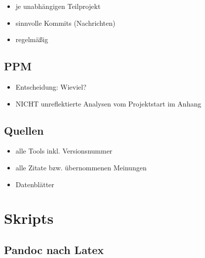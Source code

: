 \begin{itemize}
\tightlist
\item
  je unabhängigen Teilprojekt
\item
  sinnvolle Kommits (Nachrichten)
\item
  regelmäßig
\end{itemize}

\hypertarget{ppm}{%
\subsection{PPM}\label{ppm}}

\begin{itemize}
\tightlist
\item
  Entscheidung: Wieviel?
\item
  NICHT unreflektierte Analysen vom Projektstart im Anhang
\end{itemize}

\hypertarget{quellen}{%
\subsection{Quellen}\label{quellen}}

\begin{itemize}
\tightlist
\item
  alle Tools inkl. Versionsnummer
\item
  alle Zitate bzw. übernommenen Meinungen
\item
  Datenblätter \ua
\end{itemize}

\hypertarget{skripts}{%
\section{Skripts}\label{skripts}}

\hypertarget{pandoc-nach-latex}{%
\subsection{Pandoc nach Latex}\label{pandoc-nach-latex}}

